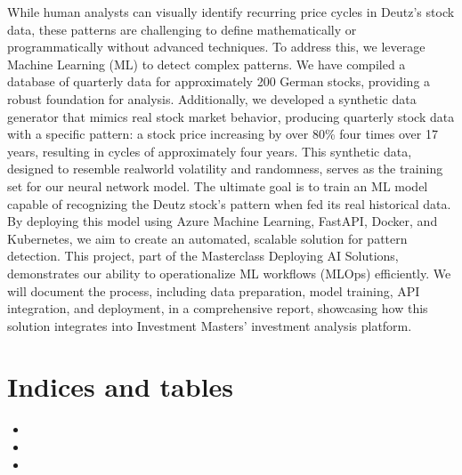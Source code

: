\documentclass[letterpaper,10pt,english]{sphinxmanual}
\begin{document}
\sphinxAtStartPar
While human analysts can visually identify recurring price cycles in Deutz’s stock data, these patterns are challenging to define mathematically or programmatically without advanced techniques. To address this, we leverage Machine Learning (ML) to detect complex patterns. We have compiled a database of quarterly data for approximately 200 German stocks, providing a robust foundation for analysis. Additionally, we developed a synthetic data generator that mimics real stock market behavior, producing quarterly stock data with a specific pattern: a stock price increasing by over 80\% four times over 17 years, resulting in cycles of approximately four years. This synthetic data, designed to resemble real\sphinxhyphen{}world volatility and randomness, serves as the training set for our neural network model. The ultimate goal is to train an ML model capable of recognizing the Deutz stock’s pattern when fed its real historical data. By deploying this model using Azure Machine Learning, FastAPI, Docker, and Kubernetes, we aim to create an automated, scalable solution for pattern detection. This project, part of the Masterclass Deploying AI Solutions, demonstrates our ability to operationalize ML workflows (MLOps) efficiently. We will document the process, including data preparation, model training, API integration, and deployment, in a comprehensive report, showcasing how this solution integrates into Investment Masters’ investment analysis platform.


\chapter{Indices and tables}
\label{\detokenize{index:indices-and-tables}}\begin{itemize}
\item {} 
\sphinxAtStartPar
{}

\item {} 
\sphinxAtStartPar
{}

\item {} 
\sphinxAtStartPar
{}

\end{itemize}



\renewcommand{\indexname}{Index}
\printindex
\end{document}

